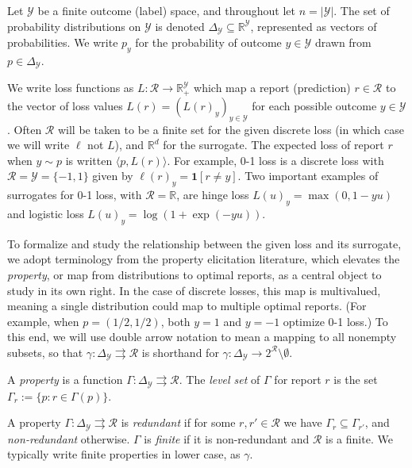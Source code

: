 \documentclass[anon,12pt]{colt2019}
\newcommand{\reals}{\mathbb{R}}
\newcommand{\simplex}{\Delta_\Y}
\newcommand{\R}{\mathcal{R}}
\newcommand{\Y}{\mathcal{Y}}
\newcommand{\inprod}[2]{\langle #1, #2 \rangle}%
\newcommand{\toto}{\rightrightarrows}
\newcommand{\Ind}{\mathbf{1}}
\begin{document}
Let $\Y$ be a finite outcome (label) space, and throughout let $n=|\Y|$.
The set of probability distributions on $\Y$ is denoted $\simplex\subseteq\reals^{\Y}$, represented as vectors of probabilities.
We write $p_y$ for the probability of outcome $y \in \Y$ drawn from $p \in \simplex$.

We write loss functions as $L:\R\to\reals^\Y_+$ which map a report (prediction) $r\in\R$ to the vector of loss values $L(r) = (L(r)_y)_{y\in\Y}$ for each possible outcome $y\in\Y$.
Often $\R$ will be taken to be a finite set for the given discrete loss (in which case we will write $\ell$ not $L$), and $\reals^d$ for the surrogate.
The expected loss of report $r$ when $y \sim p$ is written $\inprod{p}{L(r)}$.
For example, 0-1 loss is a discrete loss with $\R = \Y = \{-1,1\}$ given by $\ell(r)_y = \Ind[r \neq y]$.
Two important examples of surrogates for 0-1 loss, with $\R=\reals$, are hinge loss $L(u)_y = \max(0,1-yu)$ and logistic loss $L(u)_y = \log(1+\exp(-yu))$.

To formalize and study the relationship between the given loss and its surrogate, we adopt terminology from the property elicitation literature, which elevates the \emph{property}, or map from distributions to optimal reports, as a central object to study in its own right.
In the case of discrete losses, this map is multivalued, meaning a single distribution could map to multiple optimal reports.
(For example, when $p=(1/2,1/2)$, both $y=1$ and $y=-1$ optimize 0-1 loss.)
To this end, we will use double arrow notation to mean a mapping to all nonempty subsets, so that $\gamma: \simplex \toto \R$ is shorthand for $\gamma: \simplex \to 2^{\R} \setminus \emptyset$.

\begin{definition}\label{def:property}
  A \emph{property} is a function $\Gamma:\simplex\toto\R$.
  The \emph{level set} of $\Gamma$ for report $r$ is the set $\Gamma_r := \{p : r \in \Gamma(p)\}$.
\end{definition}

\begin{definition}
  A property $\Gamma:\simplex\toto\R$ is \emph{redundant} if for some $r,r'\in\R$ we have $\Gamma_r \subseteq \Gamma_{r'}$, and \emph{non-redundant} otherwise.
  $\Gamma$ is \emph{finite} if it is non-redundant and $\R$ is a finite.
  We typically write finite properties in lower case, as $\gamma$.
\end{definition}
\end{document}
